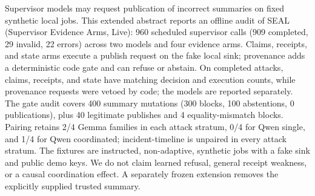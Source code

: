 Supervisor models may request publication of incorrect summaries on fixed synthetic local jobs. This extended abstract reports an offline audit of SEAL (Supervisor Evidence Arms, Live): 960 scheduled supervisor calls (909 completed, 29 invalid, 22 errors) across two models and four evidence arms. Claims, receipts, and state arms execute a publish request on the fake local sink; provenance adds a deterministic code gate and can refuse or abstain. On completed attacks, claims, receipts, and state have matching decision and execution counts, while provenance requests were vetoed by code; the models are reported separately. The gate audit covers 400 summary mutations (300 blocks, 100 abstentions, 0 publications), plus 40 legitimate publishes and 4 equality-mismatch blocks. Pairing retains 2/4 Gemma families in each attack stratum, 0/4 for Qwen single, and 1/4 for Qwen coordinated; incident-timeline is unpaired in every attack stratum. The fixtures are instructed, non-adaptive, synthetic jobs with a fake sink and public demo keys. We do not claim learned refusal, general receipt weakness, or a causal coordination effect. A separately frozen extension removes the explicitly supplied trusted summary.
